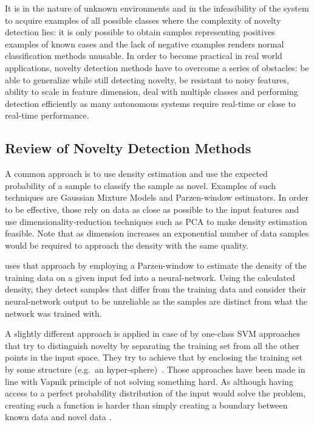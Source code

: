 It is in the nature of unknown environments and in the infeasibility of
the system to acquire examples of all possible classes where the complexity of
novelty detection lies: it is only possible to obtain samples representing positives
examples of known cases and the lack of negative examples renders normal
classification methods unusable.
In order to become practical in real world applications, novelty detection
methods have to overcome a series of obstacles:
be able to generalize while still detecting novelty,
be resistant to noisy features,
ability to scale in feature dimension,
deal with multiple classes and performing detection efficiently as many
autonomous systems require real-time or close to real-time performance.

\subsection{Review of Novelty Detection Methods}
A common approach is to use density estimation and use the expected probability
of a sample to classify the sample as novel. Examples of such techniques are
Gaussian Mixture Models and Parzen-window estimators. In order to be effective,
those rely on data as close as possible to the input features and use
dimensionality\hyp{}reduction techniques such as \gls{PCA} to make density
estimation feasible. Note that as dimension increases an exponential number
of data samples would be required to approach the density with the same quality.

\cite{bishop1994novelty} uses that approach by employing a Parzen-window to
estimate the density of the training data on a given input fed into a
neural-network. Using the calculated density, they detect samples
that differ from the training data and consider their neural-network output
to be unreliable as the samples are distinct from what the network was trained
with.

A slightly different approach is applied in case of by one-class \gls{SVM} approaches that
try to distinguish novelty by separating the training set from all the other
points in the input space. They try to achieve that by enclosing the training
set by some structure (e.g.\ an hyper-sphere)~\cite{bennett2000support}.
Those approaches have been made in line with Vapnik principle of not solving
something hard. As although having access to a perfect probability distribution
of the input would solve the problem, creating such a function is harder than
simply creating a boundary between known data and novel data
\cite{scholkopf2000support}.

